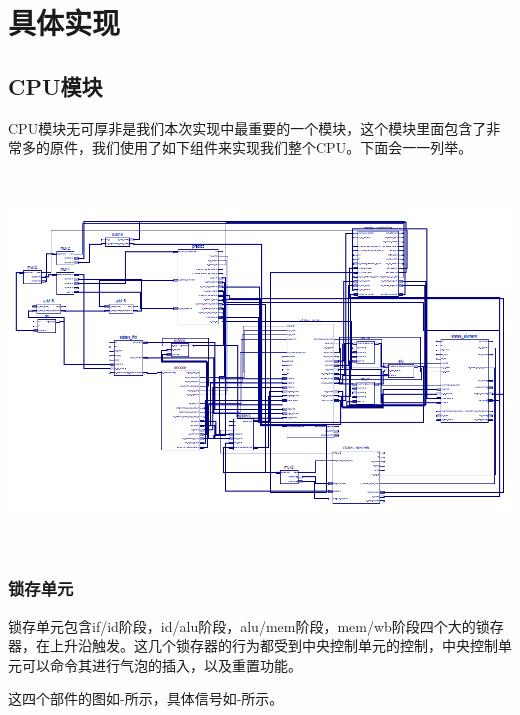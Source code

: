 \section{具体实现}

\subsection{CPU模块}

CPU模块无可厚非是我们本次实现中最重要的一个模块，这个模块里面包含了非常多的原件，我们使用了如下组件来实现我们整个CPU。下面会一一列举。

\begin{center}
    \includegraphics[height=10cm]{image/detail/detail_cpu.png}
    \label{fig:cpu_structure}
\end{center}

\subsubsection{锁存单元}

锁存单元包含if/id阶段，id/alu阶段，alu/mem阶段，mem/wb阶段四个大的锁存器，在上升沿触发。这几个锁存器的行为都受到中央控制单元的控制，中央控制单元可以命令其进行气泡的插入，以及重置功能。

这四个部件的图如-所示，具体信号如-所示。

